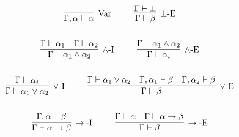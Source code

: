\begin{gather*}
\infer[\mbox{Var}]{\Gamma, \alpha \vdash \alpha}{}
~~~~ ~~~~
\infer[\bot\mbox{-E}]{\Gamma \vdash \beta}{\Gamma \vdash \bot}
\\ \\ 
\infer[\wedge\mbox{-I}]{\Gamma \vdash \alpha_1 \wedge \alpha_2}{
    \Gamma \vdash \alpha_1
    &
    \Gamma \vdash \alpha_2
}
~~~~ ~~~~
\infer[\wedge\mbox{-E}]{\Gamma \vdash \alpha_i}{
    \Gamma \vdash \alpha_1 \wedge \alpha_2
}
\\ \\ 
\infer[\vee\mbox{-I}]{\Gamma\vdash \alpha_1 \vee \alpha_2}{\Gamma \vdash \alpha_i}
~~~~ ~~~~
\infer[\vee\mbox{-E}]{\Gamma \vdash \beta}{
    \Gamma \vdash \alpha_1 \vee \alpha_2
    &
    \Gamma, \alpha_1 \vdash \beta
    &
    \Gamma, \alpha_2 \vdash \beta
}
\\ \\ 
\infer[\rightarrow\mbox{-I}]{\Gamma \vdash \alpha \rightarrow \beta}{\Gamma, \alpha \vdash \beta}
~~~~ ~~~~
\infer[\rightarrow\mbox{-E}]{\Gamma \vdash \beta}{\Gamma \vdash \alpha & \Gamma \vdash \alpha \rightarrow \beta}
\end{gather*}
